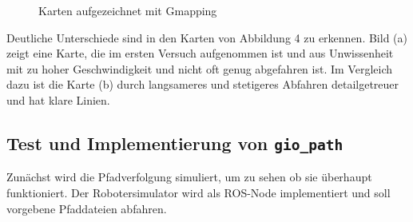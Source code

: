 \documentclass[11pt,a4paper]{article}
\begin{document}
{{	\begin{figure}[h]
		\centering
		\caption{Karten aufgezeichnet mit Gmapping}
	\end{figure}
	
	
	Deutliche Unterschiede sind in den Karten von Abbildung 4 zu erkennen. Bild (a) zeigt eine Karte, die im ersten Versuch aufgenommen ist und aus Unwissenheit mit zu hoher Geschwindigkeit und nicht oft genug abgefahren ist. Im Vergleich dazu ist die Karte (b) durch langsameres und stetigeres Abfahren detailgetreuer und hat klare Linien.
	
		
}




\subsection{Test und Implementierung von \texttt{gio\_path}}


Zun\"achst wird die Pfadverfolgung simuliert, um zu sehen ob sie \"uberhaupt funktioniert. Der Robotersimulator wird als ROS-Node implementiert und soll vorgebene Pfaddateien abfahren.


\begin{figure}[h]
\end{figure}}
\end{document}
